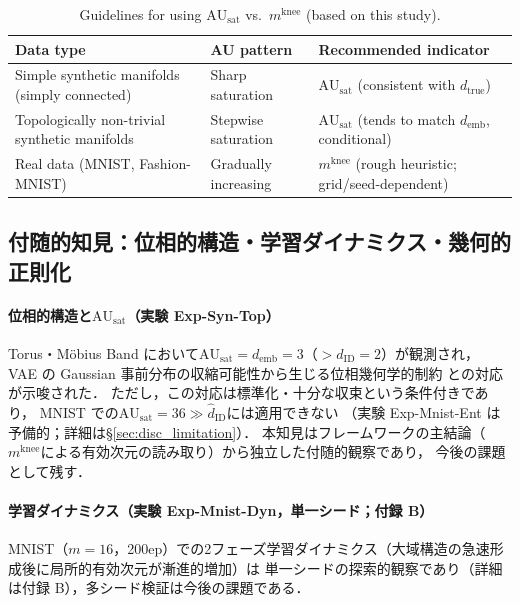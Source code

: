 \documentclass[11pt,a4paper]{jsarticle}
\newcommand{\dID}{d_{\mathrm{ID}}}
\newcommand{\dtrue}{d_{\mathrm{true}}}
\newcommand{\AUsat}{\mathrm{AU}_{\mathrm{sat}}}
\newcommand{\mknee}{m^{\mathrm{knee}}}
\newcommand{\demb}{d_{\mathrm{emb}}}
\begin{document}
\begin{table}[H]
\centering
\caption{Guidelines for using $\AUsat$ vs.\ $\mknee$ (based on this study).}
\label{tab:au_comparison}
\small
\begin{tabular}{lll}
\toprule
Data type & AU pattern & Recommended indicator \\
\midrule
Simple synthetic manifolds (simply connected) & Sharp saturation & $\AUsat$ (consistent with $\dtrue$) \\
Topologically non-trivial synthetic manifolds & Stepwise saturation & $\AUsat$ (tends to match $\demb$, conditional) \\
Real data (MNIST, Fashion-MNIST) & Gradually increasing & $\mknee$ (rough heuristic; grid/seed-dependent) \\
\bottomrule
\end{tabular}
\end{table}

\subsection{付随的知見：位相的構造・学習ダイナミクス・幾何的正則化}\label{sec:disc_incidental}

\paragraph{位相的構造と$\AUsat$（実験 Exp-Syn-Top）}
Torus・Möbius Band において$\AUsat = \demb = 3$（$> \dID = 2$）が観測され，
VAE の Gaussian 事前分布の収縮可能性から生じる位相幾何学的制約
\cite{hatcher2002algebraic,guillemin1974differential}との対応が示唆された．
ただし，この対応は標準化・十分な収束という条件付きであり，
MNIST での$\AUsat = 36 \gg \hat{d}_\mathrm{ID}$には適用できない
（実験 Exp-Mnist-Ent は予備的；詳細は§\ref{sec:disc_limitation}）．
本知見はフレームワークの主結論（$\mknee$による有効次元の読み取り）から独立した付随的観察であり，
今後の課題として残す．

\paragraph{学習ダイナミクス（実験 Exp-Mnist-Dyn，単一シード；付録 B）}
MNIST（$m=16$，200ep）での2フェーズ学習ダイナミクス（大域構造の急速形成後に局所的有効次元が漸進的増加）は
単一シードの探索的観察であり（詳細は付録 B），多シード検証は今後の課題である．
\end{document}
